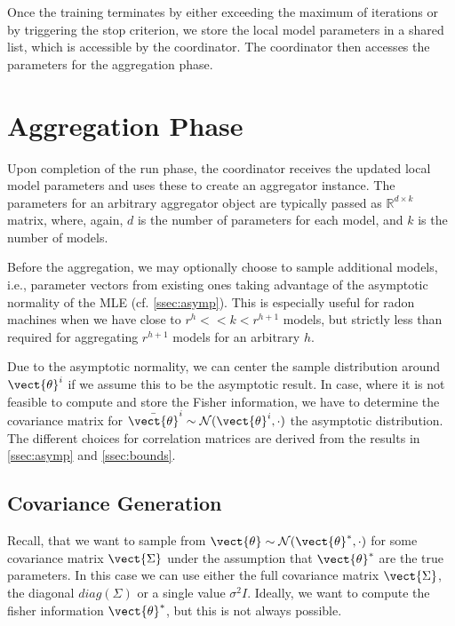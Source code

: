 Once the training terminates by either exceeding the maximum of iterations or by triggering the stop criterion, we store the local model parameters in a shared list, which is accessible by the coordinator. 
The coordinator then accesses the parameters for the aggregation phase.


\section{Aggregation Phase}
Upon completion of the run phase, the coordinator receives the updated local model parameters and uses these to create an aggregator instance.
The parameters for an arbitrary aggregator object are typically passed as $\mathbb{R}^{d \times k}$ matrix, where, again, $d$ is the number of parameters for each model, and $k$ is the number of models.

Before the aggregation, we may optionally choose to sample additional models, i.e., parameter vectors from existing ones taking advantage of the asymptotic normality of the MLE (cf. \autoref{ssec:asymp}).
This is especially useful for radon machines when we have close to $ r^h << k < r^{h+1}$ models, but strictly less than required for aggregating $r^{h+1}$ models for an arbitrary $h$.

Due to the asymptotic normality, we can center the sample distribution around $\vect{\theta}^i$ if we assume this to be the asymptotic result.
In case, where it is not feasible to compute and store the Fisher information, we have to determine the covariance matrix for $\bar{\vect{\theta}}^i \sim \mathcal{N}(\vect{\theta}^i, \cdot)$ the asymptotic distribution.
The different choices for correlation matrices are derived from the results in \autoref{ssec:asymp} and \autoref{ssec:bounds}.

\subsection{Covariance Generation}
\label{ssec:covgen}

Recall, that we want to sample from $\vect{\theta} \sim \mathcal{N}(\vect{\theta}^*, \cdot)$ for some covariance matrix $\vect{\Sigma}$ under the assumption that $\vect{\theta}^*$ are the true parameters.
In this case we can use either the full covariance matrix $\vect{\Sigma}$, the diagonal $diag(\Sigma)$ or a single value $\sigma^2 I$.
Ideally, we want to compute the fisher information \wrt $\vect{\theta}^*$, but this is not always possible.

